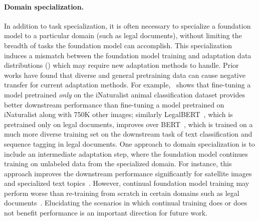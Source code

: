 \paragraph{Domain specialization.} In addition to task specialization, it is often necessary to specialize a foundation model to a particular domain (such as legal documents), without limiting the breadth of tasks the foundation model can accomplish.
This specialization induces a mismatch between the foundation model training and adaptation data distributions () which may require new adaptation methods to handle.
Prior works have found that diverse and general pretraining data can cause negative transfer for current adaptation methods.
For example,~\citet{cole2021contrastive} shows that fine-tuning a model pretrained \textit{only} on the iNaturalist animal classification dataset provides better downstream performance than fine-tuning a model pretrained on iNaturalist along with 750K other images; similarly LegalBERT~\citep{chalkidis2020legal}, which is pretrained only on legal documents, improves over BERT~\citep{devlin2019bert}, which is trained on a much more diverse training set on the downstream task of text classification and sequence tagging in legal documents.
One approach to domain specialization is to include an intermediate adaptation step, where the foundation model continues training on unlabeled data from the specialized domain. For instance, this approach improves the downstream performance significantly for satellite images and specialized text topics~\citep{reed2021selfsupervised,gururangan2020dont}.
However, continual foundation model training may perform worse than re-training from scratch in certain domains such as legal documents~\citep{chalkidis2020legal}. Elucidating the scenarios in which continual training does or does not benefit performance is an important direction for future work.

